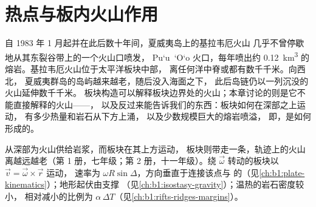 \chapter{热点与板内火山作用}\label{ch:b1:hotspots}

自 1983 年 1 月起并在此后数十年间，夏威夷岛上的基拉韦厄火山
几乎不曾停歇地从其东裂谷带上的一个火山口喷发，
Pu\textquoteleft u~\textquoteleft O\textquoteleft o 火口，每年喷出约
\qty{0.12}{km^3} 的熔岩。基拉韦厄火山位于太平洋板块中部，
离任何洋中脊或都有数千千米。向西北，
夏威夷群岛的岛屿越来越老，随后没入海面之下，
此后岛链仍以一列沉没的火山延伸数千千米。
板块构造可以解释板块边界处的火山；本章讨论的则是它不能直接解释的火山——，
以及反过来能告诉我们的东西：板块如何在深部之上运动，
有多少热量和岩石从下方上涌，
以及少数规模巨大的熔岩喷溢，
即，是如何形成的。

\begin{recall}
从深部为火山供给岩浆，而板块在其上方运动，
板块则带走一条，轨迹上的火山
离越远越老（第 1 册，七年级；第 2 册，十一年级）。绕 $\vec\omega$ 转动的板块以 $\vec v = \vec\omega\times\vec r$ 运动，
速率为 $\omega R\sin\Delta$，方向垂直于连接该点与
的（见\cref{ch:b1:plate-kinematics}）；地形起伏由支撑
（见\cref{ch:b1:isostasy-gravity}）；温热的岩石密度较小，
相对减小的比例为 $\alpha\,\Delta T$（见\cref{ch:b1:rifts-ridges-margins}）。
\end{recall}

